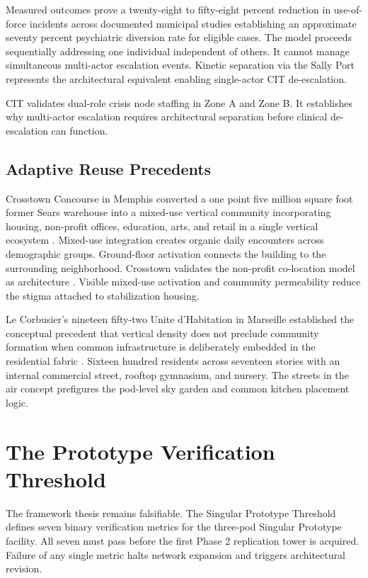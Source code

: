 \documentclass[12pt, letterpaper]{article}
\begin{document}
Measured outcomes prove a twenty-eight to fifty-eight percent reduction in use-of-force incidents across documented municipal studies establishing an approximate seventy percent psychiatric diversion rate for eligible cases. The model proceeds sequentially addressing one individual independent of others. It cannot manage simultaneous multi-actor escalation events. Kinetic separation via the Sally Port represents the architectural equivalent enabling single-actor CIT de-escalation.

CIT validates dual-role crisis node staffing in Zone A and Zone B. It establishes why multi-actor escalation requires architectural separation before clinical de-escalation can function.

\subsection{Adaptive Reuse Precedents}

Crosstown Concourse in Memphis converted a one point five million square foot former Sears warehouse into a mixed-use vertical community incorporating housing, non-profit offices, education, arts, and retail in a single vertical ecosystem \citep{crosstown_concourse_2017}. Mixed-use integration creates organic daily encounters across demographic groups. Ground-floor activation connects the building to the surrounding neighborhood. Crosstown validates the non-profit co-location model as architecture \citep{la_planning_aro_2026}. Visible mixed-use activation and community permeability reduce the stigma attached to stabilization housing.

Le Corbusier's nineteen fifty-two Unite d'Habitation in Marseille established the conceptual precedent that vertical density does not preclude community formation when common infrastructure is deliberately embedded in the residential fabric \citep{le_corbusier_1952}. Sixteen hundred residents across seventeen stories with an internal commercial street, rooftop gymnasium, and nursery. The streets in the air concept prefigures the pod-level sky garden and common kitchen placement logic.

\clearpage
\section{The Prototype Verification Threshold}

The framework thesis remains falsifiable. The Singular Prototype Threshold defines seven binary verification metrics for the three-pod Singular Prototype facility. All seven must pass before the first Phase 2 replication tower is acquired. Failure of any single metric halts network expansion and triggers architectural revision.
\end{document}
